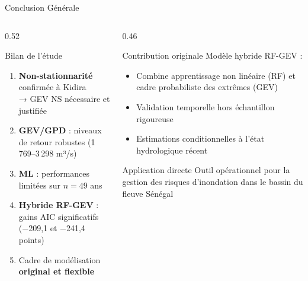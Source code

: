 \documentclass[aspectratio=169, 9pt]{beamer}
\begin{document}
\begin{frame}{Conclusion Générale}
\begin{columns}[T]
\begin{column}{0.52\textwidth}
  \begin{block}{Bilan de l'étude}
    \begin{enumerate}
      \item \textbf{Non-stationnarité}
            confirmée à Kidira\\
            → GEV NS nécessaire et justifiée
      \item \textbf{GEV/GPD} : niveaux de
            retour robustes (1\,769--3\,298 m³/s)
      \item \textbf{ML} : performances
            limitées sur $n=49$ ans
      \item \textbf{Hybride RF-GEV} :
            gains AIC significatifs\\
            ($-$209,1 et $-$241,4 points)
      \item Cadre de modélisation
            \textbf{original et flexible}
    \end{enumerate}
  \end{block}
\end{column}
\begin{column}{0.46\textwidth}
  \begin{alertblock}{Contribution originale}
    Modèle hybride RF-GEV :
    \begin{itemize}
      \item Combine apprentissage non
            linéaire (RF) et cadre
            probabiliste des extrêmes (GEV)
      \item Validation temporelle hors
            échantillon rigoureuse
      \item Estimations conditionnelles
            à l'état hydrologique récent
    \end{itemize}
  \end{alertblock}
  \vspace{0.2cm}
  \begin{block}{Application directe}
  \small
    Outil opérationnel pour la gestion
    des risques d'inondation dans le
    bassin du fleuve Sénégal
  \end{block}
\end{column}
\end{columns}
\end{frame}
\end{document}
